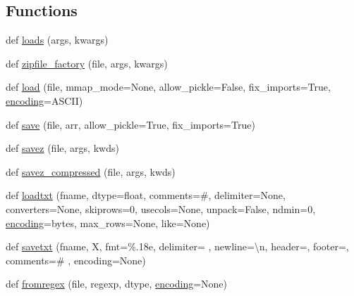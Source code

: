 \subsection*{Functions}
\begin{DoxyCompactItemize}
\item 
def \hyperlink{namespacenumpy_1_1lib_1_1npyio_a33c123b21f15823a7f66569087ba47c9}{loads} (args, kwargs)
\item 
def \hyperlink{namespacenumpy_1_1lib_1_1npyio_a4e45fbe51a28a82220e9628a8b041e24}{zipfile\+\_\+factory} (file, args, kwargs)
\item 
def \hyperlink{namespacenumpy_1_1lib_1_1npyio_a2e09f4f148164c428707c34996ade895}{load} (file, mmap\+\_\+mode=None, allow\+\_\+pickle=False, fix\+\_\+imports=True, \hyperlink{namespacenumpy_1_1lib_1_1npyio_a24fe0d72d445b9775f02fe100396d2b7}{encoding}=\textquotesingle{}A\+S\+C\+II\textquotesingle{})
\item 
def \hyperlink{namespacenumpy_1_1lib_1_1npyio_ad0e60355b784a10313d0709a07d75cd6}{save} (file, arr, allow\+\_\+pickle=True, fix\+\_\+imports=True)
\item 
def \hyperlink{namespacenumpy_1_1lib_1_1npyio_a59b05b753a01baf0dd2f22c3ca3a0e57}{savez} (file, args, kwds)
\item 
def \hyperlink{namespacenumpy_1_1lib_1_1npyio_ae02da905d175547e61d68ee4bacb8600}{savez\+\_\+compressed} (file, args, kwds)
\item 
def \hyperlink{namespacenumpy_1_1lib_1_1npyio_abf1b7ed5e18ba358b89b7a2470105034}{loadtxt} (fname, dtype=float, comments=\textquotesingle{}\#\textquotesingle{}, delimiter=None, converters=None, skiprows=0, usecols=None, unpack=False, ndmin=0, \hyperlink{namespacenumpy_1_1lib_1_1npyio_a24fe0d72d445b9775f02fe100396d2b7}{encoding}=\textquotesingle{}bytes\textquotesingle{}, max\+\_\+rows=None, like=None)
\item 
def \hyperlink{namespacenumpy_1_1lib_1_1npyio_a88314a43793724e74e5e7f13794756e6}{savetxt} (fname, X, fmt=\textquotesingle{}\%.\+18e\textquotesingle{}, delimiter=\textquotesingle{} \textquotesingle{}, newline=\textquotesingle{}\textbackslash{}n\textquotesingle{}, header=\textquotesingle{}\textquotesingle{}, footer=\textquotesingle{}\textquotesingle{}, comments=\textquotesingle{}\# \textquotesingle{}, encoding=\+None)
\item 
def \hyperlink{namespacenumpy_1_1lib_1_1npyio_aae46aabc3e6bd20b257777fe79aa5b36}{fromregex} (file, regexp, dtype, \hyperlink{namespacenumpy_1_1lib_1_1npyio_a24fe0d72d445b9775f02fe100396d2b7}{encoding}=None)

\end{DoxyCompactItemize}
